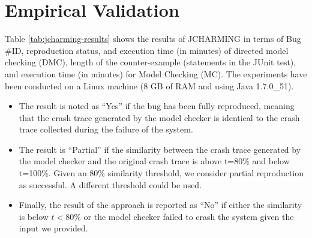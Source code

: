 \documentclass[12pt]{report}
\providecommand{\tightlist}{%
  \setlength{\itemsep}{0pt}\setlength{\parskip}{0pt}}
\begin{document}
\section{\texorpdfstring{Empirical
Validation\label{sec:results}}{Empirical Validation}}\label{empirical-validation-3}

Table \ref{tab:jcharming-results} shows the results of JCHARMING in
terms of Bug \#ID, reproduction status, and execution time (in minutes)
of directed model checking (DMC), length of the counter-example
(statements in the JUnit test), and execution time (in minutes) for
Model Checking (MC). The experiments have been conducted on a Linux
machine (8 GB of RAM and using Java 1.7.0\_51).

\begin{itemize}
\tightlist
\item
  The result is noted as ``Yes'' if the bug has been fully reproduced,
  meaning that the crash trace generated by the model checker is
  identical to the crash trace collected during the failure of the
  system.
\item
  The result is ``Partial'' if the similarity between the crash trace
  generated by the model checker and the original crash trace is above
  t=80\% and below t=100\%. Given an 80\% similarity threshold, we
  consider partial reproduction as successful. A different threshold
  could be used.
\item
  Finally, the result of the approach is reported as ``No'' if either
  the similarity is below \(t < 80\%\) or the model checker failed to
  crash the system given the input we provided.
\end{itemize}
\end{document}
